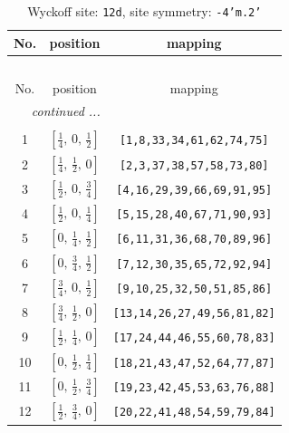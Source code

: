 \documentclass[fleqn,8pt]{jsarticle}
\begin{document}
\begin{longtable}{ccc}
\caption{Wyckoff site: {\tt 12d}, site symmetry: {\tt -4'm.2'}}
 \\
 \hline \hline
No. & position & mapping \\ \hline \endfirsthead

\multicolumn{2}{l}{\tablename\ \thetable{}} \\
 \hline \hline
No. & position & mapping \\ \hline \endhead

 \hline \hline
\multicolumn{2}{r}{\footnotesize\it continued ...} \\ \endfoot

 \hline \hline
\multicolumn{2}{r}{} \\ \endlastfoot

1 & $\left[ \frac{1}{4},\, 0,\, \frac{1}{2} \right]$ & {\tt [1,8,33,34,61,62,74,75]} \\ \hline
2 & $\left[ \frac{1}{4},\, \frac{1}{2},\, 0 \right]$ & {\tt [2,3,37,38,57,58,73,80]} \\ \hline
3 & $\left[ \frac{1}{2},\, 0,\, \frac{3}{4} \right]$ & {\tt [4,16,29,39,66,69,91,95]} \\ \hline
4 & $\left[ \frac{1}{2},\, 0,\, \frac{1}{4} \right]$ & {\tt [5,15,28,40,67,71,90,93]} \\ \hline
5 & $\left[ 0,\, \frac{1}{4},\, \frac{1}{2} \right]$ & {\tt [6,11,31,36,68,70,89,96]} \\ \hline
6 & $\left[ 0,\, \frac{3}{4},\, \frac{1}{2} \right]$ & {\tt [7,12,30,35,65,72,92,94]} \\ \hline
7 & $\left[ \frac{3}{4},\, 0,\, \frac{1}{2} \right]$ & {\tt [9,10,25,32,50,51,85,86]} \\ \hline
8 & $\left[ \frac{3}{4},\, \frac{1}{2},\, 0 \right]$ & {\tt [13,14,26,27,49,56,81,82]} \\ \hline
9 & $\left[ \frac{1}{2},\, \frac{1}{4},\, 0 \right]$ & {\tt [17,24,44,46,55,60,78,83]} \\ \hline
10 & $\left[ 0,\, \frac{1}{2},\, \frac{1}{4} \right]$ & {\tt [18,21,43,47,52,64,77,87]} \\ \hline
11 & $\left[ 0,\, \frac{1}{2},\, \frac{3}{4} \right]$ & {\tt [19,23,42,45,53,63,76,88]} \\ \hline
12 & $\left[ \frac{1}{2},\, \frac{3}{4},\, 0 \right]$ & {\tt [20,22,41,48,54,59,79,84]} \\
\end{longtable}
\renewcommand{\arraystretch}{1.2}
\end{document}
